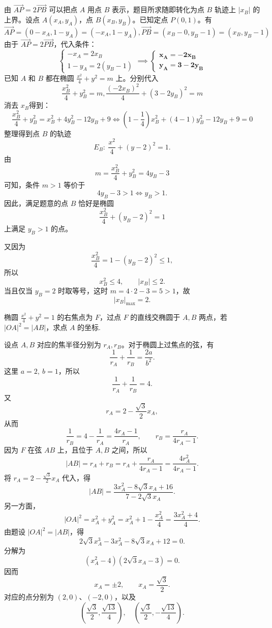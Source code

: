 \begin{solution}
由 $\overrightarrow{AP}=2\overrightarrow{PB}$ 可以把点 $A$ 用点 $B$ 表示，题目所求随即转化为点 $B$ 轨迹上 $|x_B|$ 的上界。设点 $A(x_A, y_A)$，点 $B(x_B, y_B)$。已知定点 $P(0,1)$。有
$$ \overrightarrow{AP} = (0 - x_A, 1 - y_A) = (-x_A, 1 - y_A), \overrightarrow{PB} = (x_B - 0, y_B - 1) = (x_B, y_B - 1) $$
由于 $\overrightarrow{AP} = 2\overrightarrow{PB}$，代入条件：$$ \begin{cases} -x_A = 2x_B \\ 1 - y_A = 2(y_B - 1) \end{cases} \implies \begin{cases} \mathbf{x_A = -2x_B} \\ \mathbf{y_A = 3 - 2y_B} \end{cases} $$
已知 $A$ 和 $B$ 都在椭圆 $\frac{x^2}{4} + y^2 = m$ 上。分别代入
$$ \frac{x_B^2}{4} + y_B^2 = m ,\frac{(-2x_B)^2}{4} + (3 - 2y_B)^2 = m $$
消去 $x_B$得到：$$ \frac{x_B^2}{4} + y_B^2 = x_B^2 + 4y_B^2 - 12y_B + 9 \Leftrightarrow\left(1 - \frac{1}{4}\right)x_B^2 + (4 - 1)y_B^2 - 12y_B + 9 = 0 $$
整理得到点 $B$ 的轨迹
\[
E_B:\ \frac{x^2}{4}+(y-2)^2=1.
\]
由
\[
m=\frac{x_B^2}{4}+y_B^2=4y_B-3
\]
可知，条件 $m>1$ 等价于
\[
4y_B-3>1 \iff y_B>1.
\]
因此，满足题意的点 $B$ 恰好是椭圆
\[
\frac{x_B^2}{4}+(y_B-2)^2=1
\]
上满足 $y_B>1$ 的点。

又因为
\[
\frac{x_B^2}{4}=1-(y_B-2)^2\le 1,
\]
所以
\[
x_B^2\le 4,\qquad |x_B|\le 2.
\]
当且仅当 $y_B=2$ 时取等号，这时 $m=4\cdot 2-3=5>1$，故
\[
|x_B|_{\max}=2.
\]
\end{solution}
\begin{example}[抹茶T2]
    椭圆 $\frac{x^{2}}{4}+y^{2}=1$ 的右焦点为 $F$，过点 $F$ 的直线交椭圆于 $A,B$ 两点，若 $|OA|^{2}=|AB|$，求点 $A$ 的坐标.
\end{example}
\begin{solution}
    设点 $A,B$ 对应的焦半径分别为 $r_A,r_B$。对于椭圆上过焦点的弦，有
    \[
    \frac{1}{r_A}+\frac{1}{r_B}=\frac{2a}{b^2}.
    \]
    这里 $a=2,\ b=1$，所以
    \[
    \frac{1}{r_A}+\frac{1}{r_B}=4.
    \]
    又
    \[
    r_A=2-\frac{\sqrt3}{2}x_A,
    \]
    从而
    \[
    \frac{1}{r_B}=4-\frac{1}{r_A}=\frac{4r_A-1}{r_A},
    \qquad
    r_B=\frac{r_A}{4r_A-1}.
    \]
    因为 $F$ 在弦 $AB$ 上，且位于 $A,B$ 之间，所以
    \[
    |AB|=r_A+r_B=r_A+\frac{r_A}{4r_A-1}=\frac{4r_A^2}{4r_A-1}.
    \]
    将 $r_A = 2 - \frac{\sqrt{3}}{2}x_A$ 代入，得
    \[
    |AB|=\frac{3x_A^2 - 8\sqrt{3}x_A + 16}{7 - 2\sqrt{3}x_A}.
    \]
    另一方面，
    \[
    |OA|^2=x_A^2+y_A^2=x_A^2+1-\frac{x_A^2}{4}=\frac{3x_A^2+4}{4}.
    \]
    由题设 $|OA|^2=|AB|$，得
    \[
    2\sqrt{3}x_A^3-3x_A^2-8\sqrt{3}x_A+12=0.
    \]
    分解为
    \[
    (x_A^2-4)(2\sqrt{3}x_A-3)=0.
    \]
    因而
    \[
    x_A=\pm2,\qquad x_A=\frac{\sqrt3}{2}.
    \]
    对应的点分别为 $(2,0)$、$(-2,0)$，以及
    \[
    \left(\frac{\sqrt3}{2},\frac{\sqrt{13}}{4}\right),\quad
    \left(\frac{\sqrt3}{2},-\frac{\sqrt{13}}{4}\right).
    \]
\end{solution}

